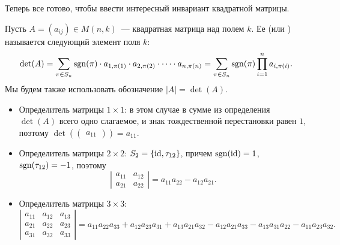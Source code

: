 Теперь все готово, чтобы ввести интересный инвариант квадратной
матрицы.
\begin{definition}
Пусть $A=(a_{ij})\in M(n,k)$~--- квадратная матрица над полем $k$. Ее
 (или ) называется следующий
элемент поля $k$:
$$
\det(A)=\sum_{\pi\in S_n}\operatorname{sgn}(\pi)\cdot a_{1,\pi(1)}\cdot
a_{2,\pi(2)}\cdot\dots\cdot a_{n,\pi(n)}=\sum_{\pi\in S_n}\operatorname{sgn}(\pi)\prod_{i=1}^na_{i,\pi(i)}.
$$
Мы будем также использовать обозначение $|A|=\det(A)$.
\end{definition}

\begin{examples}
\begin{itemize}
\item Определитель матрицы $1\times 1$: в этом случае в сумме из
  определения
  $\det(A)$ всего одно слагаемое, и знак тождественной перестановки
  равен $1$, поэтому
  $\det(\begin{pmatrix}a_{11}\end{pmatrix})=a_{11}$.
\item Определитель матрицы $2\times 2$: $S_2=\{\operatorname{id},\tau_{12}\}$,
  причем $\operatorname{sgn}(\operatorname{id})=1$, $\operatorname{sgn}(\tau_{12})=-1$, поэтому
  $$\left|\begin{matrix}a_{11}&a_{12}\\a_{21}&a_{22}\end{matrix}\right|=a_{11}a_{22}-a_{12}a_{21}.$$
\item Определитель матрицы $3\times 3$:
$$
\left|\begin{matrix}a_{11}&a_{12}&a_{13}\\a_{21}&a_{22}&a_{23}\\
a_{31}&a_{32}&a_{33}\end{matrix}\right| = a_{11}a_{22}a_{33} +
a_{12}a_{23}a_{31} + a_{13}a_{21}a_{32} - a_{12}a_{21}a_{33} -
a_{13}a_{31}a_{22} - a_{11}a_{23}a_{32}.
$$
\end{itemize}
\end{examples}

